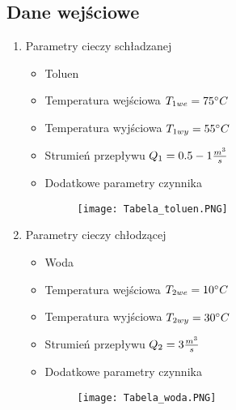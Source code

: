 \subsection{Dane wejściowe}

    \begin{enumerate}
        \item 
            \begin{flushleft}
                Parametry cieczy schładzanej
                \begin{itemize}
                    \item Toluen
                    \item Temperatura wejściowa \(T_{1we} = 75^\circ C\)
                    \item Temperatura wyjściowa \(T_{1wy} = 55^\circ C\)
                    \item Strumień przepływu    \(Q_{1} = 0.5-1\frac{m^3}{s}\)
                    \item Dodatkowe parametry czynnika    
                        \begin{figure}[h]
                            \centering
                            \texttt{[image: Tabela\_toluen.PNG]}
                        \end{figure}
                \end{itemize}
            \end{flushleft} 
        \pagebreak
        \item 
            \begin{flushleft}
                Parametry cieczy chłodzącej
                \begin{itemize}
                    \item Woda
                    \item Temperatura wejściowa \(T_{2we} = 10^\circ C\)
                    \item Temperatura wyjściowa \(T_{2wy} = 30^\circ C\)
                    \item Strumień przepływu    \(Q_{2} = 3\frac{m^3}{s}\)
                    \item Dodatkowe parametry czynnika
                        \begin{figure}[h]
                            \centering
                            \texttt{[image: Tabela\_woda.PNG]}
                        \end{figure}
                    \end{itemize}
            \end{flushleft}
        \pagebreak    
    \end{enumerate}
    

